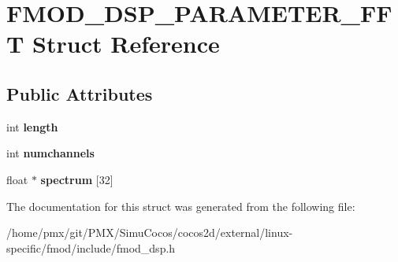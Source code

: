\hypertarget{structFMOD__DSP__PARAMETER__FFT}{}\section{F\+M\+O\+D\+\_\+\+D\+S\+P\+\_\+\+P\+A\+R\+A\+M\+E\+T\+E\+R\+\_\+\+F\+FT Struct Reference}
\label{structFMOD__DSP__PARAMETER__FFT}
\subsection*{Public Attributes}
\begin{DoxyCompactItemize}
\item 
\mbox{\label{structFMOD__DSP__PARAMETER__FFT_a5b0dd45191397a692db5e22211815877}} 
int {\bfseries length}
\item 
\mbox{\label{structFMOD__DSP__PARAMETER__FFT_a749a495bbaff014d052ad7f9bf2317e5}} 
int {\bfseries numchannels}
\item 
\mbox{\label{structFMOD__DSP__PARAMETER__FFT_aee2ddc15a89cf0ed73654cd5c607aa12}} 
float $\ast$ {\bfseries spectrum} \mbox{[}32\mbox{]}
\end{DoxyCompactItemize}


The documentation for this struct was generated from the following file\+:\begin{DoxyCompactItemize}
\item 
/home/pmx/git/\+P\+M\+X/\+Simu\+Cocos/cocos2d/external/linux-\/specific/fmod/include/fmod\+\_\+dsp.\+h\end{DoxyCompactItemize}
